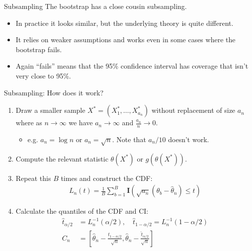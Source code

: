 \begin{frame}{Subsampling}
The bootstrap has a close cousin \alert{subsampling}.
\begin{itemize}
\item  In practice it looks similar, but the underlying theory is quite different.
\item It relies on weaker assumptions and works even in some cases where the bootstrap fails.
\item Again ``fails'' means that the 95\% confidence interval has coverage that isn't very close to 95\%.
\end{itemize}
\end{frame}


\begin{frame}{Subsampling: How does it work?}
\begin{enumerate}
\item Draw a \alert{smaller} sample $X^*=(X_1^*,\ldots,X_{a_n}^*)$ \alert{without replacement} of size $a_n$ where as $n \rightarrow \infty$ we have $a_n \rightarrow \infty$ and $\frac{a_n}{n} \rightarrow 0$.
\begin{itemize}
\item e.g. $a_n = \log n$ or $a_n = \sqrt{n}$. Note that $a_n / 10$ doesn't work.
\end{itemize}
\item Compute the relevant statistic $\theta(X^*)$ or $g(\theta(X^*))$.
\item Repeat this $B$ times and construct the CDF:
\begin{align*}
L_n(t) = \frac{1}{B} \sum_{b=1}^B \mathbf{I} \left( \sqrt{a_n}(\widehat{\theta}_b - \widehat{\theta}_n  )  \leq t \right)
\end{align*}
\item Calculate the quantiles of the CDF and CI:
\begin{align*}
\hat{t}_{\alpha / 2}&=L_{n}^{-1}(\alpha / 2), \quad \hat{t}_{1-\alpha / 2}=L_{n}^{-1}(1-\alpha / 2)\\
C_{n}&=\left[\hat{\theta}_{n}-\frac{\hat{t}_{1-\alpha / 2}}{\sqrt{n}}, \hat{\theta}_{n}-\frac{\hat{t}_{\alpha / 2}}{\sqrt{n}}\right]
\end{align*}
\end{enumerate}
\end{frame}



